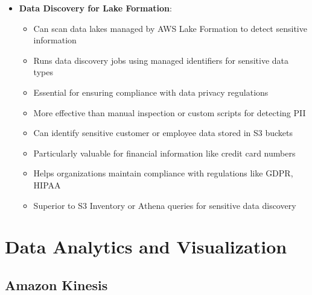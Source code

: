 \documentclass[11pt,a4paper]{report}
\begin{document}
\begin{itemize}
\begin{itemize}
  \item Essential for internal audits and compliance verification
\end{itemize}
  \item \textbf{Data Discovery for Lake Formation}:
\begin{itemize}
  \item Can scan data lakes managed by AWS Lake Formation to detect sensitive information
  \item Runs data discovery jobs using managed identifiers for sensitive data types
  \item Essential for ensuring compliance with data privacy regulations
  \item More effective than manual inspection or custom scripts for detecting PII
  \item Can identify sensitive customer or employee data stored in S3 buckets
  \item Particularly valuable for financial information like credit card numbers
  \item Helps organizations maintain compliance with regulations like GDPR, HIPAA
  \item Superior to S3 Inventory or Athena queries for sensitive data discovery
\end{itemize}
\end{itemize}

\chapter{Data Analytics and Visualization}



\section{Amazon Kinesis}
\end{document}
